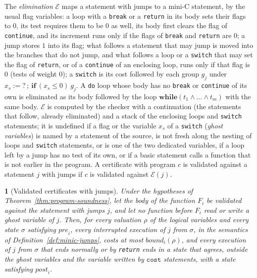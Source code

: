 \documentclass[oneside,english]{amsart}
\numberwithin{equation}{section}
\numberwithin{figure}{section}
\theoremstyle{plain}
\newtheorem{thm}{\protect\theoremname}
\theoremstyle{definition}
\theoremstyle{plain}
\theoremstyle{remark}
\theoremstyle{plain}
\theoremstyle{definition}
\theoremstyle{plain}
\theoremstyle{remark}
\providecommand{\theoremname}{Theorem}
\begin{document}
The \emph{elimination} $\mathcal{E}$ maps a statement with jumps to a mini-C statement, by the usual flag variables: a loop with a \texttt{break} or a \texttt{return} in its body sets their flags to $0$, its test requires them to be $0$ as well, its body first clears the flag of \texttt{continue}, and its increment runs only if the flags of \texttt{break} and \texttt{return} are $0$; a jump stores $1$ into its flag; what follows a statement that may jump is moved into the branches that do not jump, and what follows a loop or a \texttt{switch} that may set the flag of \texttt{return}, or of a \texttt{continue} of an enclosing loop, runs only if that flag is $0$ (tests of weight $0$); a \texttt{switch} is its cost followed by each group $g_j$ under $x_s := ?\,;\ \mathbf{if}\ (x_s \le 0)\ g_j$. A \texttt{do} loop whose body has no \texttt{break} or \texttt{continue} of its own is eliminated as its body followed by the loop $\mathbf{while}(t_1 \wedge \dots \wedge t_m)$ with the same body. $\mathcal{E}$ is computed by the checker with a continuation (the statements that follow, already eliminated) and a stack of the enclosing loops and \texttt{switch} statements; it is undefined if a flag or the variable $x_s$ of a \texttt{switch} (\emph{ghost variables}) is named by a statement of the source, is not fresh along the nesting of loops and \texttt{switch} statements, or is one of the two dedicated variables, if a loop left by a jump has no test of its own, or if a basic statement calls a function that is not earlier in the program. A certificate with program $c$ is validated against a statement $j$ with jumps if $c$ is validated against $\mathcal{E}(j)$.

\begin{thm}[Validated certificates with jumps]
\label{thm:validated-jumps}
Under the hypotheses of Theorem~\ref{thm:program-soundness}, let the body of the function $F_i$ be validated against the statement with jumps $j$, and let no function before $F_i$ read or write a ghost variable of $j$. Then, for every valuation $\rho$ of the logical variables and every state $\sigma$ satisfying $\mathit{pre}_i$, every interrupted execution of $j$ from $\sigma$, in the semantics of Definition~\ref{def:minic-jumps}, costs at most $\mathit{bound}_i(\rho)$, and every execution of $j$ from $\sigma$ that ends normally or by \texttt{return} ends in a state that agrees, outside the ghost variables and the variable written by $\mathtt{cost}$ statements, with a state satisfying $\mathit{post}_i$.
\end{thm}
\end{document}
